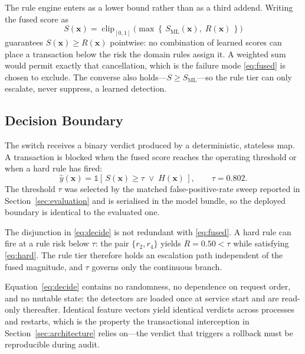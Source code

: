 \documentclass[conference]{IEEEtran}
\begin{document}
The rule engine enters as a lower bound rather than as a third addend.
Writing the fused score as
\begin{equation}
S(\mathbf{x}) = \operatorname{clip}_{[0,1]}
\Big(
\max\!\left\{\, S_{\mathrm{ML}}(\mathbf{x}),\; R(\mathbf{x}) \,\right\}
\Big)
\label{eq:fused}
\end{equation}
guarantees $S(\mathbf{x}) \geq R(\mathbf{x})$ pointwise: no combination
of learned scores can place a transaction below the risk the domain
rules assign it. A weighted sum would permit exactly that cancellation,
which is the failure mode \eqref{eq:fused} is chosen to exclude. The
converse also holds---$S \geq S_{\mathrm{ML}}$---so the rule tier can
only escalate, never suppress, a learned detection.

\subsection{Decision Boundary}
\label{subsec:decision}

The switch receives a binary verdict produced by a deterministic,
stateless map. A transaction is blocked when the fused score reaches
the operating threshold or when a hard rule has fired:
\begin{equation}
\hat{y}(\mathbf{x}) =
\mathbb{1}\!\left[\,
S(\mathbf{x}) \geq \tau
\;\vee\;
H(\mathbf{x})
\,\right],
\qquad \tau = 0.802 .
\label{eq:decide}
\end{equation}
The threshold $\tau$ was selected by the matched false-positive-rate
sweep reported in Section~\ref{sec:evaluation} and is serialised in the
model bundle, so the deployed boundary is identical to the evaluated
one.

The disjunction in \eqref{eq:decide} is not redundant with
\eqref{eq:fused}. A hard rule can fire at a rule risk below $\tau$: the
pair $\{r_{2}, r_{4}\}$ yields $R = 0.50 < \tau$ while satisfying
\eqref{eq:hard}. The rule tier therefore holds an escalation path
independent of the fused magnitude, and $\tau$ governs only the
continuous branch.

Equation~\eqref{eq:decide} contains no randomness, no dependence on
request order, and no mutable state: the detectors are loaded once at
service start and are read-only thereafter. Identical feature vectors
yield identical verdicts across processes and restarts, which is the
property the transactional interception in
Section~\ref{sec:architecture} relies on---the verdict that triggers a
rollback must be reproducible during audit.
\end{document}
